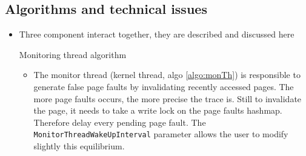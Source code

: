 \subsection{Algorithms and technical issues}
\begin{itemize}
    \item Three component interact together, they are described and discussed
        here
        \begin{algorithm}[htb]
            \caption{Monitoring thread algorithm}
            \label{algo:monTh}
            \begin{algorithmic}[1]
                \State {}
                            \State {}
                        \EndFor
                    \EndFor
                    \State {}
                \EndWhile
            \end{algorithmic}
        \end{algorithm}
        \begin{itemize}
            \item The monitor thread (kernel thread, algo \ref{algo:monTh}) is
                responsible to generate false page faults by invalidating
                recently accessed pages. The more page faults occurs, the more
                precise the trace is. Still to invalidate the page, it needs
                to take a write lock on the page faults hashmap. Therefore
                delay every pending page fault. The
                \texttt{MonitorThreadWakeUpInterval} parameter allows the user
                to modify slightly this equilibrium.


\end{itemize}
\end{itemize}
